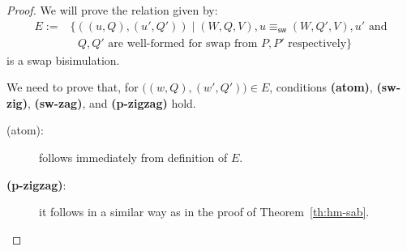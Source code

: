 \begin{proof}
We will prove the relation given by:
\begin{align*}
    E := & \{ ((u,{Q}),(u',{Q}')) \mid  (W,{Q},V), u \equiv_{\mathsf{sw}} (W,{Q}',V) , u ' \text{ and} \\
    & \text{ ${Q},{Q'}$ are well-formed for swap from $P,P'$ respectively} \} 
\end{align*}
is a swap bisimulation. %

We need to prove that, for  $\big((w,{Q}) ,(w',{Q}')\big)\in E$, conditions \textbf{(atom)}, \textbf{(sw-zig)}, \textbf{(sw-zag)}, and \textbf{(p-zigzag)} hold. 

\begin{description}
    \item[(atom):] follows immediately from definition of $E$. 

    \item[\textbf{(p-zigzag)}:]  it follows in a similar way as in the proof of Theorem~\ref{th:hm-sab}.
         

\end{description}
\end{proof}
